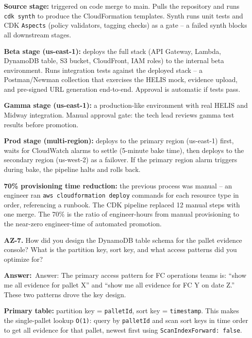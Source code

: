 \documentclass[letterpaper,10pt]{article}
\newlength{\boxwidth}
\newcommand{\answerlabel}{\noindent\textbf{\textcolor{answerblue}{Answer:}}~}
\begin{document}
\textbf{Source stage:} triggered on code merge to main. Pulls the repository and runs \texttt{cdk synth} to produce the CloudFormation templates. Synth runs unit tests and CDK \texttt{Aspects} (policy validators, tagging checks) as a gate -- a failed synth blocks all downstream stages.

\textbf{Beta stage (us-east-1):} deploys the full stack (API Gateway, Lambda, DynamoDB table, S3 bucket, CloudFront, IAM roles) to the internal beta environment. Runs integration tests against the deployed stack -- a Postman/Newman collection that exercises the HELIS mock, evidence upload, and pre-signed URL generation end-to-end. Approval is automatic if tests pass.

\textbf{Gamma stage (us-east-1):} a production-like environment with real HELIS and Midway integration. Manual approval gate: the tech lead reviews gamma test results before promotion.

\textbf{Prod stage (multi-region):} deploys to the primary region (us-east-1) first, waits for CloudWatch alarms to settle (5-minute bake time), then deploys to the secondary region (us-west-2) as a failover. If the primary region alarm triggers during bake, the pipeline halts and rolls back.

\textbf{70\% provisioning time reduction:} the previous process was manual -- an engineer ran \texttt{aws cloudformation deploy} commands for each resource type in order, referencing a runbook. The CDK pipeline replaced 12 manual steps with one merge. The 70\% is the ratio of engineer-hours from manual provisioning to the near-zero engineer-time of automated promotion.

\vspace{6pt}

\colorbox{qbg}{\begin{minipage}{\boxwidth}
\textbf{AZ-7.} How did you design the DynamoDB table schema for the pallet evidence console? What is the partition key, sort key, and what access patterns did you optimize for?
\end{minipage}}

\vspace{2pt}
\answerlabel{Answer:} The primary access pattern for FC operations teams is: ``show me all evidence for pallet X'' and ``show me all evidence for FC Y on date Z.'' These two patterns drove the key design.

\textbf{Primary table:} partition key = \texttt{palletId}, sort key = \texttt{timestamp}. This makes the single-pallet lookup \texttt{O(1)}: query by \texttt{palletId} and scan sort keys in time order to get all evidence for that pallet, newest first using \texttt{ScanIndexForward: false}.
\end{document}
